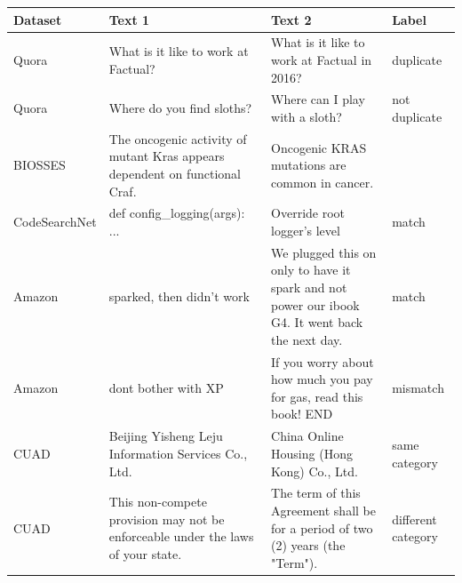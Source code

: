 \setlength{\tabcolsep}{4pt}
\begin{tabularx}{\textwidth}{@{}l>{\raggedright\arraybackslash}X>{\raggedright\arraybackslash}X>{\raggedright\arraybackslash}p{2.1cm}@{}}
\toprule
Dataset & Text 1 & Text 2 & Label \\
\midrule
Quora & What is it like to work at Factual? & What is it like to work at Factual in 2016? & duplicate \\
Quora & Where do you find sloths? & Where can I play with a sloth? & not duplicate \\
BIOSSES & The oncogenic activity of mutant Kras appears dependent on functional Craf. & Oncogenic KRAS mutations are common in cancer. & 2.0 \\
CodeSearchNet & def config\_logging(args): ... & Override root logger's level & match \\
Amazon & sparked, then didn't work & We plugged this on only to have it spark and not power our ibook G4. It went back the next day. & match \\
Amazon & dont bother with XP & If you worry about how much you pay for gas, read this book! END & mismatch \\
CUAD & Beijing Yisheng Leju Information Services Co., Ltd. & China Online Housing (Hong Kong) Co., Ltd. & same category \\
CUAD & This non-compete provision may not be enforceable under the laws of your state. & The term of this Agreement shall be for a period of two (2) years (the "Term"). & different category \\
\bottomrule
\end{tabularx}
